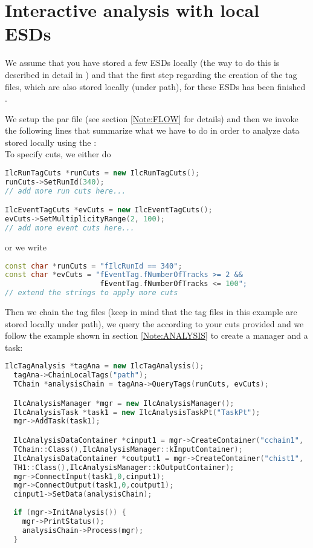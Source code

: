 \section{Interactive analysis with local ESDs}
\label{Note:LOCAL}

We assume that you have stored a few ESDs locally (the way to do this is described in detail in \cite{Note:RefIlcenTutorial}) and that the first step regarding the creation of the tag files, which are also stored locally (under {\ttfamily path}), for these ESDs has been finished \cite{Note:RefEventTagNote}.

We setup the {\ttfamily par file} (see section \ref{Note:FLOW} for details) and then we invoke the following lines that summarize what we have to do  in order to analyze data stored locally using the \tag:\\

To specify cuts, we either do
\begin{lstlisting}[language=C++]
IlcRunTagCuts *runCuts = new IlcRunTagCuts();
runCuts->SetRunId(340);
// add more run cuts here...

IlcEventTagCuts *evCuts = new IlcEventTagCuts();
evCuts->SetMultiplicityRange(2, 100);
// add more event cuts here...
\end{lstlisting}
or we write
\begin{lstlisting}[language=C++]
const char *runCuts = "fIlcRunId == 340";
const char *evCuts = "fEventTag.fNumberOfTracks >= 2 &&
                      fEventTag.fNumberOfTracks <= 100";
// extend the strings to apply more cuts
\end{lstlisting}

Then we chain the tag files (keep in mind that the tag files in this example are stored locally under {\ttfamily path}), we query the \tag according to your cuts provided and we follow the example shown in section \ref{Note:ANALYSIS} to create a manager and a task:
\begin{lstlisting}[language=C++]
  IlcTagAnalysis *tagAna = new IlcTagAnalysis();
  tagAna->ChainLocalTags("path");
  TChain *analysisChain = tagAna->QueryTags(runCuts, evCuts);

  IlcAnalysisManager *mgr = new IlcAnalysisManager();
  IlcAnalysisTask *task1 = new IlcAnalysisTaskPt("TaskPt");
  mgr->AddTask(task1);

  IlcAnalysisDataContainer *cinput1 = mgr->CreateContainer("cchain1",
  TChain::Class(),IlcAnalysisManager::kInputContainer);
  IlcAnalysisDataContainer *coutput1 = mgr->CreateContainer("chist1", 
  TH1::Class(),IlcAnalysisManager::kOutputContainer);
  mgr->ConnectInput(task1,0,cinput1);
  mgr->ConnectOutput(task1,0,coutput1);
  cinput1->SetData(analysisChain);
  
  if (mgr->InitAnalysis()) {
    mgr->PrintStatus();
    analysisChain->Process(mgr);
  }

\end{lstlisting}

